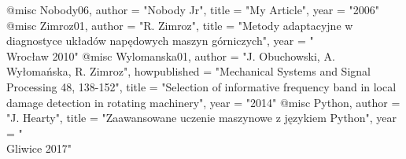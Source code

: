 @misc{ Nobody06,
       author = "Nobody Jr",
       title = "My Article",
       year = "2006" }
@misc{ Zimroz01,
    	author = "R. Zimroz",
    	title = "Metody adaptacyjne w diagnostyce układów napędowych maszyn górniczych",
    	year = "\\Wrocław 2010" }
@misc{ Wylomanska01,
	author = "J. Obuchowski, A. Wyłomańska, R. Zimroz",
	howpublished = "Mechanical Systems and Signal Processing 48, 138-152",
	title = "Selection of informative frequency band in local damage detection in rotating machinery",
	year = "2014"
	}
@misc{ Python,
	author = "J. Hearty",
	title = "Zaawansowane uczenie maszynowe z językiem Python",
	year = "\\Gliwice 2017" }
